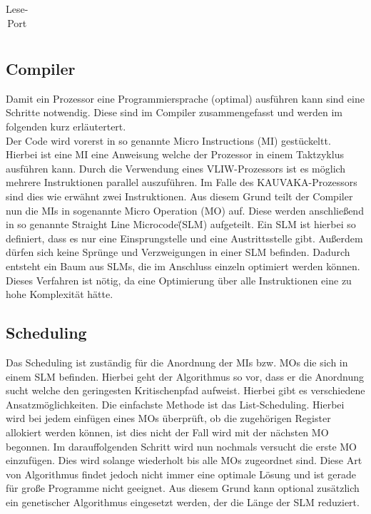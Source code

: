 \begin{table}[htbp]
\begin{minipage}{.4\textwidth}
\begin{tabular}{cccccccccccccccccc}
		\end{tabular}
		\caption{\label{lese-port}Lese-Port}
	\end{minipage}
\end{table}


\subsection{Compiler}
Damit ein Prozessor eine Programmiersprache (optimal) ausführen kann sind eine Schritte notwendig. Diese sind im Compiler zusammengefasst und werden im folgenden kurz erläutertert.\\
Der Code wird vorerst in so genannte Micro Instructions (MI) gestückeltt.  Hierbei ist eine MI eine Anweisung welche der Prozessor in einem Taktzyklus ausführen kann. Durch die Verwendung eines VLIW-Prozessors ist es möglich mehrere Instruktionen parallel auszuführen. Im Falle des KAUVAKA-Prozessors sind dies wie erwähnt zwei Instruktionen. Aus diesem Grund teilt der Compiler nun die MIs in sogenannte Micro Operation (MO) auf. Diese werden anschließend in so genannte \"Straight Line Microcode\" (SLM) aufgeteilt. Ein SLM ist hierbei so definiert, dass es nur eine Einsprungstelle und eine Austrittsstelle gibt. Außerdem dürfen sich keine Sprünge und Verzweigungen in einer SLM befinden.  Dadurch entsteht ein Baum aus SLMs, die im Anschluss einzeln optimiert werden können. Dieses Verfahren ist nötig, da eine Optimierung über alle Instruktionen eine zu hohe Komplexität hätte. 
\subsection{Scheduling}
Das Scheduling ist zuständig für die Anordnung der MIs bzw. MOs die sich in einem SLM befinden. Hierbei geht der Algorithmus so vor, dass er die Anordnung sucht welche den geringesten Kritischenpfad aufweist. Hierbei gibt es verschiedene Ansatzmöglichkeiten. Die einfachste Methode ist das List-Scheduling. Hierbei wird bei jedem einfügen eines MOs überprüft, ob die zugehörigen Register allokiert werden können, ist dies nicht der Fall wird mit der nächsten MO begonnen. Im darauffolgenden Schritt wird nun nochmals versucht die erste MO einzufügen. Dies wird solange wiederholt bis alle MOs zugeordnet sind.
Diese Art von Algorithmus findet jedoch nicht immer eine optimale Lösung und ist gerade für große Programme nicht geeignet. Aus diesem Grund kann optional zusätzlich ein genetischer Algorithmus eingesetzt werden, der die Länge der SLM reduziert.


